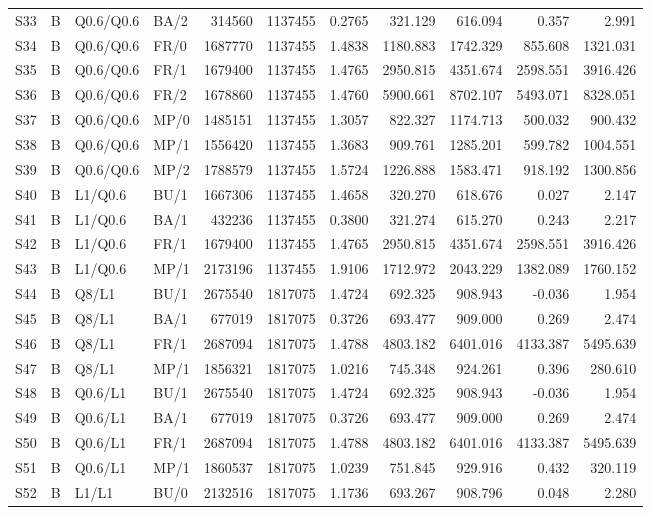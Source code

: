 \begin{longtable}{llllrrrrrrr}
S33 & B & Q0.6/Q0.6 & BA/2 & 314560 & 1137455 & 0.2765 & 321.129 & 616.094 & 0.357 & 2.991\\
S34 & B & Q0.6/Q0.6 & FR/0 & 1687770 & 1137455 & 1.4838 & 1180.883 & 1742.329 & 855.608 & 1321.031\\
S35 & B & Q0.6/Q0.6 & FR/1 & 1679400 & 1137455 & 1.4765 & 2950.815 & 4351.674 & 2598.551 & 3916.426\\
S36 & B & Q0.6/Q0.6 & FR/2 & 1678860 & 1137455 & 1.4760 & 5900.661 & 8702.107 & 5493.071 & 8328.051\\
S37 & B & Q0.6/Q0.6 & MP/0 & 1485151 & 1137455 & 1.3057 & 822.327 & 1174.713 & 500.032 & 900.432\\
S38 & B & Q0.6/Q0.6 & MP/1 & 1556420 & 1137455 & 1.3683 & 909.761 & 1285.201 & 599.782 & 1004.551\\
S39 & B & Q0.6/Q0.6 & MP/2 & 1788579 & 1137455 & 1.5724 & 1226.888 & 1583.471 & 918.192 & 1300.856\\
S40 & B & L1/Q0.6 & BU/1 & 1667306 & 1137455 & 1.4658 & 320.270 & 618.676 & 0.027 & 2.147\\
S41 & B & L1/Q0.6 & BA/1 & 432236 & 1137455 & 0.3800 & 321.274 & 615.270 & 0.243 & 2.217\\
S42 & B & L1/Q0.6 & FR/1 & 1679400 & 1137455 & 1.4765 & 2950.815 & 4351.674 & 2598.551 & 3916.426\\
S43 & B & L1/Q0.6 & MP/1 & 2173196 & 1137455 & 1.9106 & 1712.972 & 2043.229 & 1382.089 & 1760.152\\
S44 & B & Q8/L1 & BU/1 & 2675540 & 1817075 & 1.4724 & 692.325 & 908.943 & -0.036 & 1.954\\
S45 & B & Q8/L1 & BA/1 & 677019 & 1817075 & 0.3726 & 693.477 & 909.000 & 0.269 & 2.474\\
S46 & B & Q8/L1 & FR/1 & 2687094 & 1817075 & 1.4788 & 4803.182 & 6401.016 & 4133.387 & 5495.639\\
S47 & B & Q8/L1 & MP/1 & 1856321 & 1817075 & 1.0216 & 745.348 & 924.261 & 0.396 & 280.610\\
S48 & B & Q0.6/L1 & BU/1 & 2675540 & 1817075 & 1.4724 & 692.325 & 908.943 & -0.036 & 1.954\\
S49 & B & Q0.6/L1 & BA/1 & 677019 & 1817075 & 0.3726 & 693.477 & 909.000 & 0.269 & 2.474\\
S50 & B & Q0.6/L1 & FR/1 & 2687094 & 1817075 & 1.4788 & 4803.182 & 6401.016 & 4133.387 & 5495.639\\
S51 & B & Q0.6/L1 & MP/1 & 1860537 & 1817075 & 1.0239 & 751.845 & 929.916 & 0.432 & 320.119\\
S52 & B & L1/L1 & BU/0 & 2132516 & 1817075 & 1.1736 & 693.267 & 908.796 & 0.048 & 2.280\\

\end{longtable}
